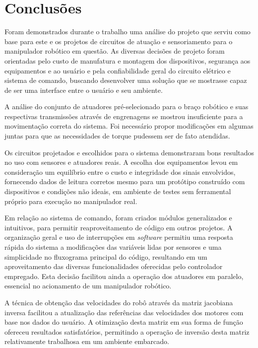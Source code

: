 \chapter{Conclusões}

\label{CapConclusoes}

Foram demonstrados durante o trabalho uma análise do projeto que serviu como base para este e os projetos
de circuitos de atuação e sensoriamento para o manipulador robótico em questão. As diversas decisões de 
projeto foram orientadas pelo custo de manufatura e montagem dos dispositivos, segurança aos equipamentos e ao 
usuário e pela confiabilidade geral do circuito elétrico e sistema de comando, buscando desenvolver uma 
solução que se mostrasse capaz de ser uma interface entre o usuário e seu ambiente.

A análise do conjunto de atuadores pré-selecionado para o braço robótico e suas respectivas transmissões 
através de engrenagens se mostrou insuficiente para a movimentação correta do sistema. Foi necessário 
propor modificações em algumas juntas para que as necessidades de torque pudessem ser de fato atendidas.

Os circuitos projetados e escolhidos para o sistema demonstraram bons resultados no uso com sensores e atuadores reais. 
A escolha dos equipamentos levou em consideração um equilíbrio entre o custo e integridade 
dos sinais envolvidos, fornecendo dados de leitura corretos mesmo para um protótipo construído com dispositivos e 
condições não ideais, em ambiente de testes sem ferramental próprio para execução no manipulador real.

Em relação ao sistema de comando, foram criados módulos generalizados e intuitivos, para permitir reaproveitamento de código em 
outros projetos. A organização geral e uso de interrupções em \textit{software} permitiu uma resposta rápida do sistema a modificações
das variáveis lidas por sensores e uma simplicidade no fluxograma principal do código, resultando em um aproveitamento
das diversas funcionalidades oferecidas pelo controlador empregado. Esta decisão facilitou ainda a operação
dos atuadores em paralelo, essencial no acionamento de um manipulador robótico.

A técnica de obtenção das velocidades do robô através da matriz jacobiana inversa facilitou a atualização das
referências das velocidades dos motores com base nos dados do usuário. A otimização desta matriz 
em sua forma de função ofereceu resultados satisfatórios, permitindo a operação de inversão desta matriz
relativamente trabalhosa em um ambiente embarcado.

